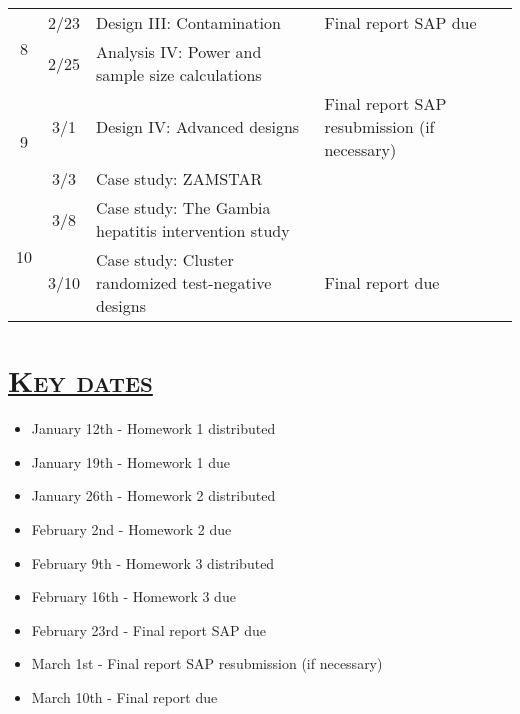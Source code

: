 \documentclass[fancyhdr,10pt]{article}
\begin{document}
\begin{center}
\begin{tabular}{|c|c|m{3in}|l|}
    \multirow{2}{*}{8}  & 2/23   & Design III: Contamination &  Final report SAP due \\\cline{2-4}
                        & 2/25   & Analysis IV: Power and sample size calculations &\\\hline\hline
    \multirow{2}{*}{9}  & 3/1  & Design IV: Advanced designs &  Final report SAP resubmission (if necessary)\\\cline{2-4}
                        & 3/3  & Case study: ZAMSTAR & \\\hline\hline
    \multirow{2}{*}{10} & 3/8  & Case study: The Gambia hepatitis intervention study  & \\\cline{2-4}
                        & 3/10  & Case study: Cluster randomized test-negative designs & Final report due \\\hline\hline
  \end{tabular}
\end{center}

\section*{\underline{\textsc{Key dates}}}
\begin{itemize}
 \item January 12th - Homework 1 distributed
 \item January 19th - Homework 1 due
 \item January 26th - Homework 2 distributed
 \item February 2nd - Homework 2 due
 \item February 9th - Homework 3 distributed
 \item February 16th - Homework 3 due
 \item February 23rd - Final report SAP due
 \item March 1st - Final report SAP resubmission (if necessary)
 \item March 10th - Final report due
\end{itemize}
\end{document}

